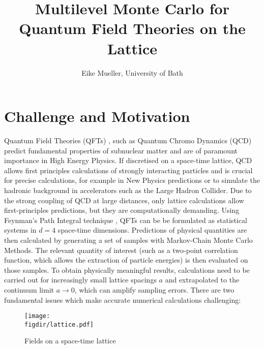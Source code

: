 \documentclass[11pt]{article}
\author{Eike Mueller, University of Bath}
\title{Multilevel Monte Carlo for Quantum Field Theories on the Lattice}
\newcommand{\figdir}{./figures/}
\begin{document}
\maketitle
\section{Challenge and Motivation}
Quantum Field Theories (QFTs) \cite{Peskin1995}, such as Quantum Chromo Dynamics (QCD) predict fundamental properties of subnuclear matter and are of paramount importance in High Energy Physics. If discretised on a space-time lattice, QCD allows first principles calculations of strongly interacting particles and is crucial for precise calculations, for example in New Physics predictions or to simulate the hadronic background in accelerators such as the Large Hadron Collider. 
Due to the strong coupling of QCD at large distances, only lattice calculations allow first-principles predictions, but they are computationally demanding. Using Feynman's Path Integral technique \cite{Feynman2010}, QFTs can be be formulated as statistical systems in $d=4$ space-time dimensions. Predictions of physical quantities are then calculated by generating a set of samples with Markov-Chain Monte Carlo Methods. The relevant quantity of interest (such as a two-point correlation function, which allows the extraction of particle energies) is then evaluated on those samples. To obtain physically meaningful results, calculations need to be carried out for increasingly small lattice spacings $a$ and extrapolated to the continuum limit $a\rightarrow 0$, which can amplify sampling errors. There are two fundamental issues which make accurate numerical calculations challenging:
\begin{figure}
  \begin{center}
    \texttt{[image: \\figdir/lattice.pdf]}
    \caption{Fields on a space-time lattice}
    \label{fig:lattice}
  \end{center}
\end{figure}
\end{document}
